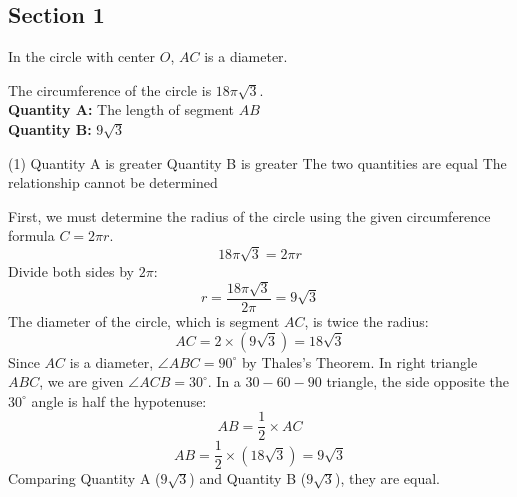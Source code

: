 \documentclass[11pt,paper=a4,answers]{exam}
\begin{document}
\begin{questions}
\pointsinrightmargin
\pointsdroppedatright
\marksnotpoints
{}
\pointformat{\boldmath\themarginpoints}
\bracketedpoints
\section*{Section 1}



\question
In the circle with center $O$, $AC$ is a diameter.
\begin{center}
\end{center}
The circumference of the circle is $18\pi\sqrt{3}$.
\\[0.3cm]
\textbf{Quantity A: } The length of segment $AB$ \\
\textbf{Quantity B: } $9\sqrt{3}$

\begin{tasks}(1)
\task[A)] Quantity A is greater
\task[B)] Quantity B is greater
\task[C)] The two quantities are equal
\task[D)] The relationship cannot be determined
\end{tasks}

\begin{solution}
First, we must determine the radius of the circle using the given circumference formula $C = 2\pi r$.
\vspace{5pt}
\[ 18\pi\sqrt{3} = 2\pi r \]
\vspace{5pt}
Divide both sides by $2\pi$:
\vspace{5pt}
\[ r = \dfrac{18\pi\sqrt{3}}{2\pi} = 9\sqrt{3} \]
\vspace{5pt}
The diameter of the circle, which is segment $AC$, is twice the radius:
\vspace{5pt}
\[ AC = 2 \times (9\sqrt{3}) = 18\sqrt{3} \]
\vspace{5pt}
Since $AC$ is a diameter, $\angle ABC = 90^\circ$ by Thales's Theorem. In right triangle $ABC$, we are given $\angle ACB = 30^\circ$.
\vspace{5pt}
In a $30-60-90$ triangle, the side opposite the $30^\circ$ angle is half the hypotenuse:
\vspace{5pt}
\[ AB = \dfrac{1}{2} \times AC \]
\vspace{5pt}
\[ AB = \dfrac{1}{2} \times (18\sqrt{3}) = 9\sqrt{3} \]
\vspace{5pt}
Comparing Quantity A ($9\sqrt{3}$) and Quantity B ($9\sqrt{3}$), they are equal.


\end{solution}
\end{questions}
\end{document}

